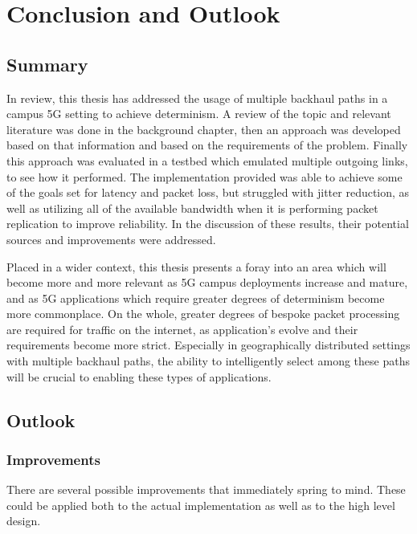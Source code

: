 
\cleardoublepage
\chapter{Conclusion and Outlook}
\label{cha:conclusion}

\section{Summary}

In review, this thesis has addressed the usage of multiple backhaul paths in a campus 5G setting to achieve determinism. A review of the topic and relevant literature was done in the background chapter, then an approach was developed based on that information and based on the requirements of the problem. Finally this approach was evaluated in a testbed which emulated multiple outgoing links, to see how it performed. The implementation provided was able to achieve some of the goals set for latency and packet loss, but struggled with jitter reduction, as well as utilizing all of the available bandwidth when it is performing packet replication to improve reliability. In the discussion of these results, their potential sources and improvements were addressed.

Placed in a wider context, this thesis presents a foray into an area which will become more and more relevant as 5G campus deployments increase and mature, and as 5G applications which require greater degrees of determinism become more commonplace. On the whole, greater degrees of bespoke packet processing are required for traffic on the internet, as application's evolve and their requirements become more strict. Especially in geographically distributed settings with multiple backhaul paths, the ability to intelligently select among these paths will be crucial to enabling these types of applications.


\section{Outlook}

\subsection{Improvements}

There are several possible improvements that immediately spring to mind. These could be applied both to the actual implementation as well as to the high level design.

